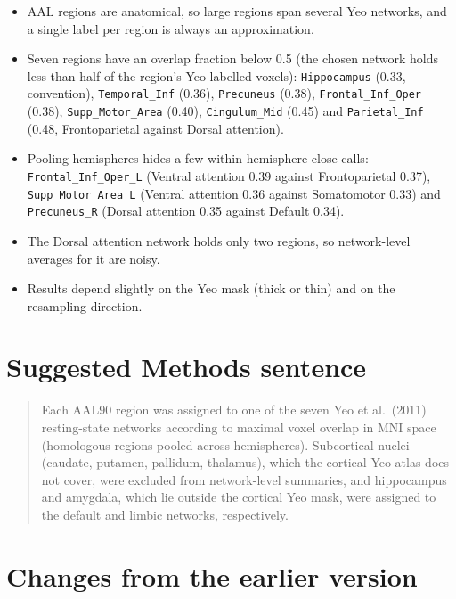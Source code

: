 \documentclass[a4paper,10pt]{article}
\newcommand{\aal}[1]{\texttt{#1}}
\begin{document}
\begin{itemize}
\item AAL regions are anatomical, so large regions span several Yeo networks, and a single label per region is always an approximation.
\item Seven regions have an overlap fraction below 0.5 (the chosen network holds less than half of the region's Yeo-labelled voxels): \aal{Hippocampus} (0.33, convention), \aal{Temporal\_Inf} (0.36), \aal{Precuneus} (0.38), \aal{Frontal\_Inf\_Oper} (0.38), \aal{Supp\_Motor\_Area} (0.40), \aal{Cingulum\_Mid} (0.45) and \aal{Parietal\_Inf} (0.48, Frontoparietal against Dorsal attention).
\item Pooling hemispheres hides a few within-hemisphere close calls: \aal{Frontal\_Inf\_Oper\_L} (Ventral attention 0.39 against Frontoparietal 0.37), \aal{Supp\_Motor\_Area\_L} (Ventral attention 0.36 against Somatomotor 0.33) and \aal{Precuneus\_R} (Dorsal attention 0.35 against Default 0.34).
\item The Dorsal attention network holds only two regions, so network-level averages for it are noisy.
\item Results depend slightly on the Yeo mask (thick or thin) and on the resampling direction.
\end{itemize}

\section*{Suggested Methods sentence}

\begin{quote}
Each AAL90 region was assigned to one of the seven Yeo et al.~(2011) resting-state networks according to maximal voxel overlap in MNI space (homologous regions pooled across hemispheres).
Subcortical nuclei (caudate, putamen, pallidum, thalamus), which the cortical Yeo atlas does not cover, were excluded from network-level summaries, and hippocampus and amygdala, which lie outside the cortical Yeo mask, were assigned to the default and limbic networks, respectively.
\end{quote}

\section*{Changes from the earlier version}\label{sec:changes}
\end{document}
